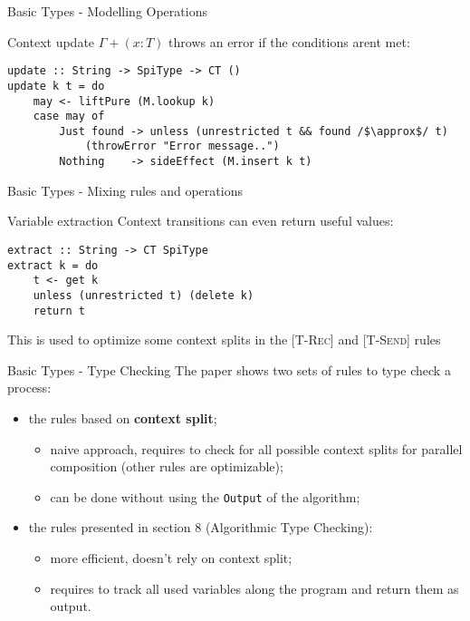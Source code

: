 \begin{frame}[fragile]{Basic Types - Modelling Operations}

    \begin{exampleblock}{Context update}
        $\Gamma + (x : T)$ throws an error if the conditions arent met:
        \small\begin{verbatim}
update :: String -> SpiType -> CT ()
update k t = do
    may <- liftPure (M.lookup k)
    case may of
        Just found -> unless (unrestricted t && found /$\approx$/ t) 
            (throwError "Error message..")
        Nothing    -> sideEffect (M.insert k t)
        \end{verbatim}
    \end{exampleblock}
    
\end{frame}


\begin{frame}[fragile]{Basic Types - Mixing rules and operations}

    \begin{exampleblock}{Variable extraction}
        Context transitions can even return useful values:
        \small\begin{verbatim}
extract :: String -> CT SpiType
extract k = do
    t <- get k
    unless (unrestricted t) (delete k)
    return t
        \end{verbatim}
    \end{exampleblock}

    This is used to optimize some context splits in the [\textsc{T-Rec}] and [\textsc{T-Send}] rules

\end{frame}

\begin{frame}{Basic Types - Type Checking}
    The paper shows two sets of rules to type check a process:
    \begin{itemize}
        \item the rules based on \textbf{context split};
        \begin{itemize}
            \item naive approach, requires to check for all possible context splits for parallel composition (other rules are optimizable);
            \item can be done without using the \texttt{Output} of the algorithm;
        \end{itemize}
        \item the rules presented in section 8 (Algorithmic Type Checking):
        \begin{itemize}
            \item more efficient, doesn't rely on context split;
            \item requires to track all used variables along the program and return them as output.
        \end{itemize}
    \end{itemize}
\end{frame}

